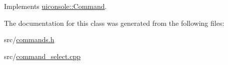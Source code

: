Implements \hyperlink{classuiconsole_1_1Command_a5c4d205b1de13a6b3d0db73ddc7ebefa}{uiconsole::Command}.



The documentation for this class was generated from the following files:\begin{DoxyCompactItemize}
\item 
src/\hyperlink{commands_8h}{commands.h}\item 
src/\hyperlink{command__select_8cpp}{command\_\-select.cpp}\end{DoxyCompactItemize}
